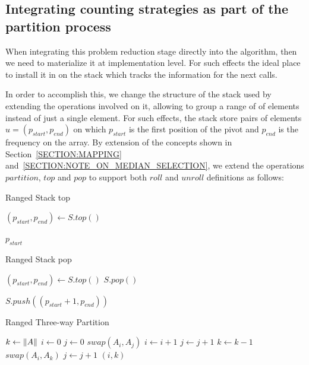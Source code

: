 \subsection{Integrating counting strategies as part of the partition process}

When integrating this problem reduction stage directly into the algorithm, then we need to materialize it at implementation level. For such effects the ideal place to install it in on the stack which tracks the information for the next calls. 

In order to accomplish this, we change the structure of the stack used by extending the operations involved on it, allowing to group a range of of elements instead of just a single element. For such effects, the stack store pairs of elements $u = (p_{start}, p_{end})$ on which $p_{start}$ is the first position of the pivot and $p_{end}$ is the frequency on the array. By extension of the concepts shown in Section~\ref{SECTION:MAPPING} and~\ref{SECTION:NOTE_ON_MEDIAN_SELECTION}, we extend the operations $partition$, $top$ and $pop$ to support both $roll$ and $unroll$ definitions as follows:



\begin{algorithm}
    \caption{Ranged Stack top}\label{ALG:STACK_TOP}
    \begin{algorithmic}[1]
        \State $(p_{start}, p_{end}) \gets S.top()$
        
        \State \Return $p_{start}$
        \EndProcedure
\end{algorithmic}
\end{algorithm}


\begin{algorithm}
    \caption{Ranged Stack pop}\label{ALG:STACK_POP}
    \begin{algorithmic}[1]
        \State $(p_{start}, p_{end}) \gets S.top()$
        \State $S.pop()$
    
            \State $S.push((p_{start}+1, p_{end}))$
        \EndIf
        \EndProcedure
\end{algorithmic}
\end{algorithm}

\begin{algorithm}
\caption{Ranged Three-way Partition}\label{ALG:DUTCH_FLAG_PARTITION_RANGED}
\begin{algorithmic}[1]
    \State $k \gets \lVert A\rVert$
    \State $i \gets 0$
    \State $j \gets 0$
            \State $swap(A_i, A_j)$
            \State $i \gets i+1$
            \State $j \gets j+1$
            \State $k \gets k-1$
            \State $swap(A_i, A_k)$
        \Else
            \State $j \gets j+1$
        \EndIf
    \EndWhile
    \State \Return $(i,k)$
    \EndProcedure
\end{algorithmic}
\end{algorithm}

